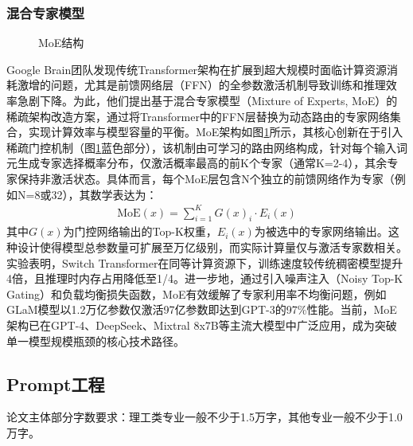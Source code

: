 \documentclass[UTF8,a4paper,12pt]{ctexart}
\numberwithin{equation}{section}
\begin{document}
\subsubsection{混合专家模型}
\begin{figure}[htb]
	\caption{MoE结构}
	\label{MoE}
\end{figure}
Google Brain团队发现传统Transformer架构在扩展到超大规模时面临计算资源消耗激增的问题，尤其是前馈网络层（FFN）的全参数激活机制导致训练和推理效率急剧下降。为此，他们提出基于混合专家模型（Mixture of Experts, MoE）的稀疏架构改造方案，通过将Transformer中的FFN层替换为动态路由的专家网络集合，实现计算效率与模型容量的平衡。MoE架构如图\ref{MoE}所示，其核心创新在于引入稀疏门控机制（图\ref{MoE}蓝色部分），该机制由可学习的路由网络构成，针对每个输入词元生成专家选择概率分布，仅激活概率最高的前K个专家（通常K=2-4），其余专家保持非激活状态。具体而言，每个MoE层包含N个独立的前馈网络作为专家（例如N=8或32），其数学表达为：
\begin{eqnarray}
	\mathrm{MoE}(x)=\sum_{i=1}^KG(x)_i\cdot E_i(x)
	\label{func_5}
\end{eqnarray}
其中$G(x)$为门控网络输出的Top-K权重，$E_i(x)$为被选中的专家网络输出。这种设计使得模型总参数量可扩展至万亿级别，而实际计算量仅与激活专家数相关。实验表明，Switch Transformer在同等计算资源下，训练速度较传统稠密模型提升4倍，且推理时内存占用降低至1/4。进一步地，通过引入噪声注入（Noisy Top-K Gating）和负载均衡损失函数，MoE有效缓解了专家利用率不均衡问题，例如GLaM模型以1.2万亿参数仅激活97亿参数即达到GPT-3的97\%性能。当前，MoE架构已在GPT-4、DeepSeek、Mixtral 8x7B等主流大模型中广泛应用，成为突破单一模型规模瓶颈的核心技术路径。
\subsection{Prompt工程}
论文主体部分字数要求：理工类专业一般不少于1.5万字，其他专业一般不少于1.0万字。
\end{document}

